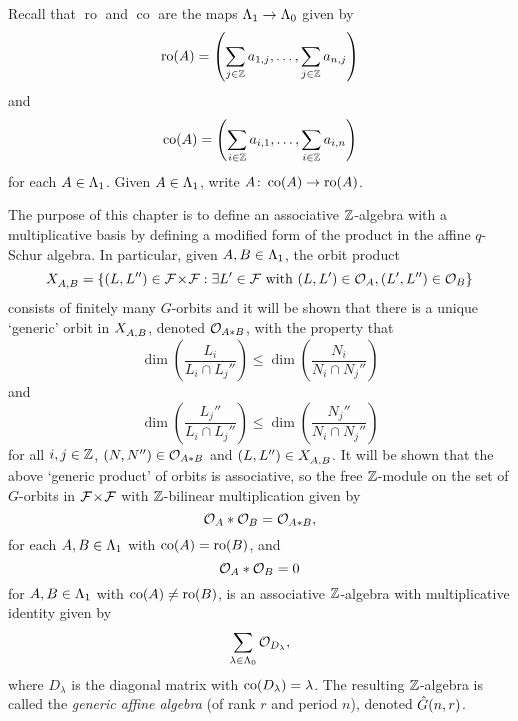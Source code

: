 \documentclass[a4paper, 11pt]{report}
\begin{document}
Recall that $\operatorname{ro}$ and $\operatorname{co}$ are the maps $\Lambda_1{}\to\Lambda_0{}$ given by
\begin{equation*}
\operatorname{ro}(A) = \left(\sum_{j\in\mathbb{Z}} a_{1,j},\ldots, \sum_{j\in\mathbb{Z}}a_{n,j}\right)
\end{equation*}
and
\begin{equation*}
\operatorname{co}(A) = \left(\sum_{i\in\mathbb{Z}} a_{i,1},\ldots, \sum_{i\in\mathbb{Z}} a_{i,n}\right)
\end{equation*}
for each $A\in\Lambda_1{}$. Given $A\in\Lambda_1{}$, write $A\colon\operatorname{co}(A)\to\operatorname{ro}(A)$.

The purpose of this chapter is to define an associative $\mathbb{Z}$-algebra with a multiplicative basis by defining a modified form of the product in the affine $q$-Schur algebra. In particular, given $A,B\in\Lambda_1{}$, the orbit product
\begin{equation*}
X_{A,B}^{} = \{(L,L'')\in{\mathcal{F}\!\times\!\mathcal{F}}: \exists L'\in\mathcal{F}\text{ with } (L,L')\in\mathcal{O}_{A}, (L',L'')\in\mathcal{O}_{B}\}
\end{equation*}
consists of finitely many $G$-orbits and it will be shown that there is a unique `generic' orbit in $X_{A,B}^{}$, denoted $\mathcal{O}_{A\ast B}$, with the property that
\begin{equation*}
\dim\left(\frac{L_i}{L_i\cap L_j''}\right)\le\dim\left(\frac{N_i}{N_i\cap N_j''}\right)
\end{equation*}
and
\begin{equation*}
\dim\left(\frac{L_j''}{L_i\cap L_j''}\right)\le\dim\left(\frac{N_j''}{N_i\cap N_j''}\right)
\end{equation*}
for all $i,j\in\mathbb{Z}$, $(N,N'')\in\mathcal{O}_{A\ast B}$ and $(L,L'')\in X_{A,B}^{}$. It will be shown that the above `generic product' of orbits is associative, so the free $\mathbb{Z}$-module on the set of $G$-orbits in ${\mathcal{F}\!\times\!\mathcal{F}}$ with $\mathbb{Z}$-bilinear multiplication given by
\begin{equation*}
\mathcal{O}_{A}\ast\mathcal{O}_{B}=\mathcal{O}_{A\ast B},
\end{equation*}
for each $A,B\in\Lambda_1{}$ with $\operatorname{co}(A)=\operatorname{ro}(B)$, and
\begin{equation*}
\mathcal{O}_{A}\ast\mathcal{O}_{B} = 0
\end{equation*}
for $A,B\in\Lambda_1{}$ with $\operatorname{co}(A)\neq\operatorname{ro}(B)$, is an associative $\mathbb{Z}$-algebra with multiplicative identity given by
\begin{equation*}
\sum_{\lambda\in\Lambda_0{}} \mathcal{O}_{D_\lambda},
\end{equation*}
where $D_\lambda$ is the diagonal matrix with $\operatorname{co}(D_\lambda)=\lambda$. The resulting $\mathbb{Z}$-algebra is called the \emph{generic affine algebra} (of rank $r$ and period $n$), denoted $\hat{G}(n,r)$.
\end{document}
